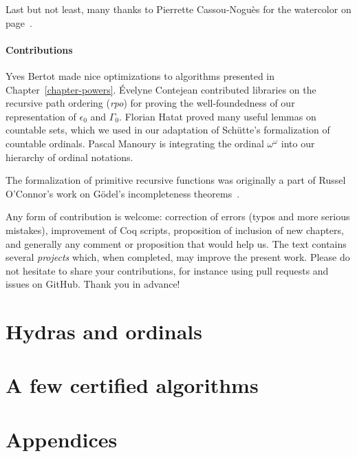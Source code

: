 \documentclass[twoside,a4paper]{book}
\begin{document}
Last but not least, many thanks to Pierrette Cassou-Noguès for the watercolor on page~\pageref{watercolor}.

\subsection{Contributions}

Yves Bertot made nice optimizations  to algorithms presented in Chapter~\ref{chapter-powers}.
\'Evelyne Contejean contributed libraries on the recursive path ordering (\emph{rpo}) for proving the well-foundedness of our representation of $\epsilon_0$ and $\Gamma_0$.
Florian Hatat proved many useful lemmas on countable sets, which we used in our adaptation of Schütte's formalization of countable ordinals. Pascal Manoury is integrating the ordinal $\omega^\omega$ into our hierarchy of ordinal notations.

The formalization of primitive recursive functions was originally a part of  Russel O'Connor's work on G\"odel's incompleteness theorems~\cite{OConnor05}. 

\label{sec:orgheadline2}

Any form of contribution  is welcome: correction of errors (typos and more serious mistakes), improvement of
Coq scripts, proposition of inclusion of new chapters, and generally any
comment or proposition that would help us. The text contains several \emph{projects} which, when completed, may improve the present work.
Please do not hesitate to share your contributions, for instance using pull requests and issues on GitHub. Thank you in advance!






\part{Hydras and ordinals}



\part{A few  certified algorithms}



\part{Appendices}
\end{document}
